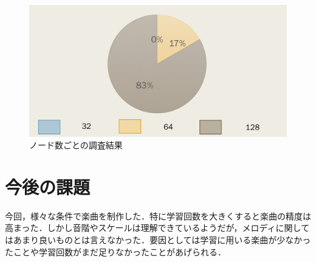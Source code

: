 \newpage
\begin{figure}[h]
    \begin{screen}
    \begin{center}
        \includegraphics[scale=0.5, clip]{./img/glaph3.png}
        \caption{ノード数ごとの調査結果}
        \label{fig:ノード数の調査結果}
    \end{center}
    \end{screen}
\end{figure}
\newpage
\section{今後の課題}
今回，様々な条件で楽曲を制作した．特に学習回数を大きくすると楽曲の精度は高まった．しかし音階やスケールは理解できているようだが，メロディに関してはあまり良いものとは言えなかった．要因としては学習に用いる楽曲が少なかったことや学習回数がまだ足りなかったことがあげられる．\\
